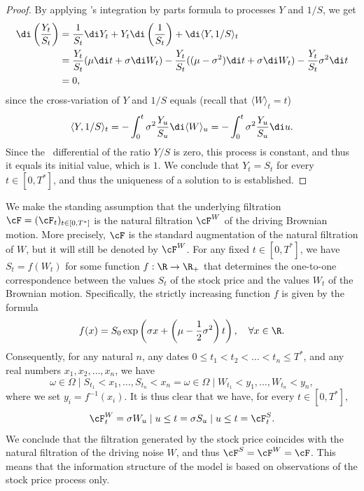 \begin{proof}
	By applying \Ito's integration by parts formula to processes $Y$ and $1/S$, we get
	\begin{align*}
		\di \left(\frac{Y_t}{S_t}\right) & = \frac{1}{S_t} \di Y_t + Y_t \di \left(\frac{1}{S_t}\right) + \di \langle Y, 1/S \rangle_t                                              \\
		                                 & = \frac{Y_t}{S_t}(\mu \di t + \sigma \di W_t) - \frac{Y_t}{S_t}((\mu - \sigma^2) \di t + \sigma \di W_t) - \frac{Y_t}{S_t}\sigma^2 \di t \\
		                                 & = 0,
	\end{align*}
	since the cross-variation of $Y$ and $1/S$ equals (recall that $\langle W \rangle_t = t$)
	\begin{equation} \label{eq:CrossVariation}
		\langle Y, 1/S \rangle_t = - \int_0^t \sigma^2 \frac{Y_u}{S_u} \di \langle W \rangle_u = - \int_0^t \sigma^2 \frac{Y_u}{S_u} \di u.
	\end{equation}
	Since the \Ito\ differential of the ratio $Y/S$ is zero, this process is constant, and thus it equals its initial value, which is $1$. We conclude that $Y_t = S_t$ for every $t \in [0, T^*]$, and thus the uniqueness of a solution to  is established.
\end{proof}

We make the standing assumption that the underlying filtration $\cF = (\cF_t)_{t \in [0, T^*]}$ is the natural filtration $\cF^W$ of the driving Brownian motion. More precisely, $\cF$ is the standard augmentation of the natural filtration of $W$, but it will still be denoted by $\cF^W$. For any fixed $t \in [0, T^*]$, we have $S_t = f(W_t)$ for some function $f : \R \to \R_+$ that determines the one-to-one correspondence between the values $S_t$ of the stock price and the values $W_t$ of the Brownian motion. Specifically, the strictly increasing function $f$ is given by the formula
\begin{equation} \label{eq:StockBrownianCorrespondence}
	f(x) = S_0 \exp \left(\sigma x + \left(\mu - \frac{1}{2}\sigma^2\right)t\right), \quad \forall x \in \R.
\end{equation}
Consequently, for any natural $n$, any dates $0 \le t_1 < t_2 < \dots < t_n \le T^*$, and any real numbers $x_1, x_2, \dots, x_n$, we have
\begin{equation} \label{eq:EventEquivalence}
	{\omega \in \Omega \mid S_{t_1} < x_1, \dots, S_{t_n} < x_n } = {\omega \in \Omega \mid W_{t_1} < y_1, \dots, W_{t_n} < y_n },
\end{equation}
where we set $y_i = f^{-1}(x_i)$. It is thus clear that we have, for every $t \in [0, T^*]$,
\begin{equation} \label{eq:FiltrationEquality}
	\cF_t^W = \sigma{W_u \mid u \le t} = \sigma{S_u \mid u \le t} = \cF_t^S.
\end{equation}
We conclude that the filtration generated by the stock price coincides with the natural filtration of the driving noise $W$, and thus $\cF^S = \cF^W = \cF$. This means that the information structure of the model is based on observations of the stock price process only.

